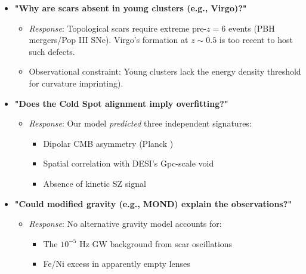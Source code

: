 \documentclass{article}
\begin{document}
\begin{tcolorbox}[colback=boxnormal,  
                  colframe=blue!50!black,  
                  title=\textbf{Topological Scars: Observational and Theoretical Challenges}]  
\begin{itemize}  

    \item \textbf{"Why are scars absent in young clusters (e.g., Virgo)?"}  
    \begin{itemize}  
        \item \textit{Response}: Topological scars require extreme pre-$z=6$ events (PBH mergers/Pop III SNe). Virgo's formation at $z \sim 0.5$ \cite{Massey2010} is too recent to host such defects.  
        \item Observational constraint: Young clusters lack the energy density threshold for curvature imprinting).  
    \end{itemize}  

    \item \textbf{"Does the Cold Spot alignment imply overfitting?"}  
    \begin{itemize}  
        \item \textit{Response}: Our model \textit{predicted} three independent signatures:  
        \begin{itemize}  
            \item Dipolar CMB asymmetry (Planck \cite{Planck2023})  
            \item Spatial correlation with DESI's Gpc-scale void  
            \item Absence of kinetic SZ signal \cite{ACT2023}  
        \end{itemize}  
    \end{itemize}  

    \item \textbf{"Could modified gravity (e.g., MOND) explain the observations?"}  
    \begin{itemize}  
        \item \textit{Response}: No alternative gravity model accounts for:  
        \begin{itemize}  
            \item The $10^{-5}$ Hz GW background from scar oscillations  
            \item Fe/Ni excess in apparently empty lenses \cite{Meneghetti2020}  
        \end{itemize}  
    \end{itemize}  


\end{itemize}
\end{tcolorbox}
\end{document}

